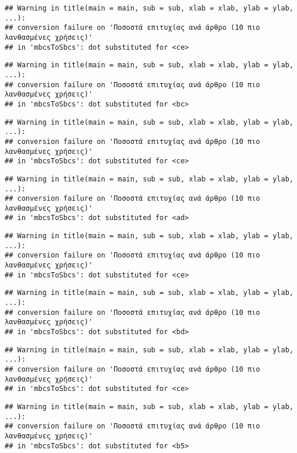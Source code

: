 \documentclass[
]{article}
\begin{document}
\begin{verbatim}
## Warning in title(main = main, sub = sub, xlab = xlab, ylab = ylab, ...):
## conversion failure on 'Ποσοστά επιτυχίας ανά άρθρο (10 πιο λανθασμένες χρήσεις)'
## in 'mbcsToSbcs': dot substituted for <ce>
\end{verbatim}

\begin{verbatim}
## Warning in title(main = main, sub = sub, xlab = xlab, ylab = ylab, ...):
## conversion failure on 'Ποσοστά επιτυχίας ανά άρθρο (10 πιο λανθασμένες χρήσεις)'
## in 'mbcsToSbcs': dot substituted for <bc>
\end{verbatim}

\begin{verbatim}
## Warning in title(main = main, sub = sub, xlab = xlab, ylab = ylab, ...):
## conversion failure on 'Ποσοστά επιτυχίας ανά άρθρο (10 πιο λανθασμένες χρήσεις)'
## in 'mbcsToSbcs': dot substituted for <ce>
\end{verbatim}

\begin{verbatim}
## Warning in title(main = main, sub = sub, xlab = xlab, ylab = ylab, ...):
## conversion failure on 'Ποσοστά επιτυχίας ανά άρθρο (10 πιο λανθασμένες χρήσεις)'
## in 'mbcsToSbcs': dot substituted for <ad>
\end{verbatim}

\begin{verbatim}
## Warning in title(main = main, sub = sub, xlab = xlab, ylab = ylab, ...):
## conversion failure on 'Ποσοστά επιτυχίας ανά άρθρο (10 πιο λανθασμένες χρήσεις)'
## in 'mbcsToSbcs': dot substituted for <ce>
\end{verbatim}

\begin{verbatim}
## Warning in title(main = main, sub = sub, xlab = xlab, ylab = ylab, ...):
## conversion failure on 'Ποσοστά επιτυχίας ανά άρθρο (10 πιο λανθασμένες χρήσεις)'
## in 'mbcsToSbcs': dot substituted for <bd>
\end{verbatim}

\begin{verbatim}
## Warning in title(main = main, sub = sub, xlab = xlab, ylab = ylab, ...):
## conversion failure on 'Ποσοστά επιτυχίας ανά άρθρο (10 πιο λανθασμένες χρήσεις)'
## in 'mbcsToSbcs': dot substituted for <ce>
\end{verbatim}

\begin{verbatim}
## Warning in title(main = main, sub = sub, xlab = xlab, ylab = ylab, ...):
## conversion failure on 'Ποσοστά επιτυχίας ανά άρθρο (10 πιο λανθασμένες χρήσεις)'
## in 'mbcsToSbcs': dot substituted for <b5>
\end{verbatim}
\end{document}
